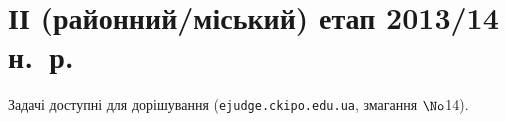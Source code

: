 \documentclass[14pt,a4paper]{extarticle}
\begin{document}
% 

	



% 

	







\section{ІІ (районний/міський) етап 2013/14 н.~р.}

Задачі доступні для дорішування (\verb"ejudge.ckipo.edu.ua", змагання $\No$14).

\renewenvironment{problemAllDefault}[1]{\vspace{10mm}\par\begin{problem}{#1}{Клавіатура (stdin)}{Екран (stdout)}{1 сек}{64 мегабайти}}{\end{problem}}
\end{document}
